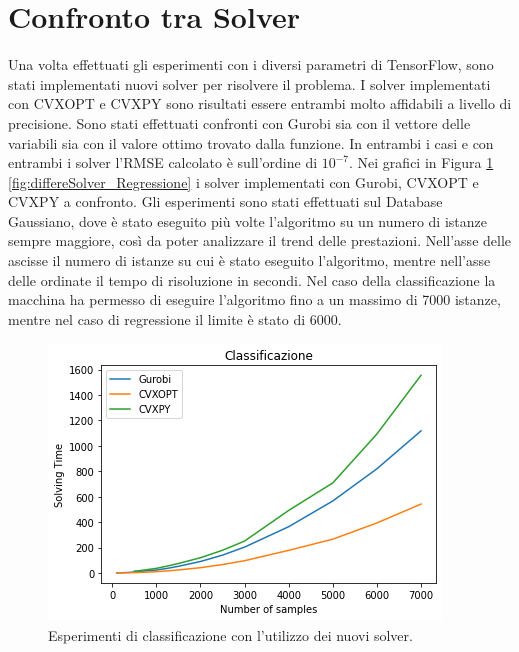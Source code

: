 \documentclass[a4paper,12pt]{report}
\begin{document}
\section{Confronto tra Solver}
Una volta effettuati gli esperimenti con i diversi parametri di TensorFlow, sono stati implementati nuovi solver per risolvere il problema. I solver implementati con CVXOPT e CVXPY sono risultati essere entrambi molto affidabili a livello di precisione. Sono stati effettuati confronti con Gurobi sia con il vettore delle variabili sia con il valore ottimo trovato dalla funzione. In entrambi i casi e con entrambi i solver l'RMSE calcolato è sull'ordine di $10^{-7}$. Nei grafici in Figura \ref{fig:differeSolver_Classification} \ref{fig:differeSolver_Regressione} i solver implementati con Gurobi, CVXOPT e CVXPY a confronto. Gli esperimenti sono stati effettuati sul Database Gaussiano, dove è stato eseguito più volte l'algoritmo su un numero di istanze sempre maggiore, così da poter analizzare il trend delle prestazioni. Nell'asse delle ascisse il numero di istanze su cui è stato eseguito l'algoritmo, mentre nell'asse delle ordinate il tempo di risoluzione in secondi. Nel caso della classificazione la macchina ha permesso di eseguire l'algoritmo fino a un massimo di 7000 istanze, mentre nel caso di regressione il limite è stato di 6000.

\begin{figure}[H]
    \centering
    \includegraphics[scale=0.8]{images/Grafici/DifferentSolver_Classification.png}
    \caption{Esperimenti di classificazione con l'utilizzo dei nuovi solver.}
    \label{fig:differeSolver_Classification}
\end{figure}
\end{document}
